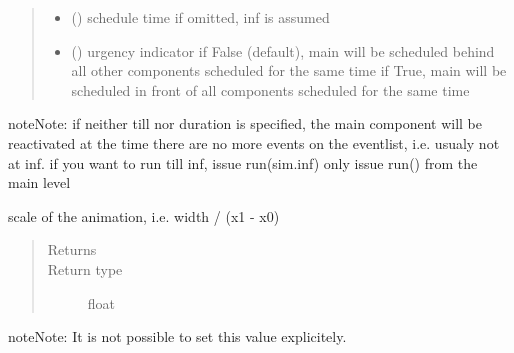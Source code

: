 \documentclass[letterpaper,10pt,english]{sphinxmanual}
\begin{document}
\begin{fulllineitems}
\begin{fulllineitems}
\begin{quote}
\begin{description}
\begin{itemize}
\item {} 
 () \textendash{} schedule time 
if omitted, inf is assumed

\item {} 
 () \textendash{} urgency indicator 
if False (default), main will be scheduled
behind all other components scheduled
for the same time 
if True, main will be scheduled
in front of all components scheduled
for the same time

\end{itemize}

\end{description}\end{quote}

\begin{sphinxadmonition}{note}{Note:}
if neither till nor duration is specified, the main component will be reactivated at
the time there are no more events on the eventlist, i.e. usualy not at inf. 
if you want to run till inf, issue run(sim.inf) 
only issue run() from the main level
\end{sphinxadmonition}

\end{fulllineitems}


\begin{fulllineitems}
\label{\detokenize{Reference:salabim.Environment.scale}}
scale of the animation, i.e. width / (x1 - x0)
\begin{quote}\begin{description}
\item[{Returns}] \leavevmode
{}

\item[{Return type}] \leavevmode
float

\end{description}\end{quote}

\begin{sphinxadmonition}{note}{Note:}
It is not possible to set this value explicitely.
\end{sphinxadmonition}

\end{fulllineitems}



\end{fulllineitems}
\end{document}
